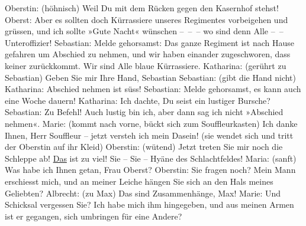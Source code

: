 \begin{ledgroupsized}[t]{13cm}
           \pstart
           Oberstin: (höhnisch) Weil Du mit dem Rücken gegen den Kasernhof stehst!\pend
           \pstart
           Oberst: Aber es sollten doch Kürrassiere unseres Regimentes vorbeigehen und grüssen,
               und ich sollte »Gute Nacht« wünschen – – – wo sind denn Alle – – Unteroffizier!\pend
           \pstart
           Sebastian: Melde gehorsamst: Das ganze Regiment ist nach Hause gefahren um Abschied
               zu nehmen, und wir haben einander {\pb}zugeschworen, dass keiner zurückkommt. Wir sind Alle blaue Kürrassiere.\pend
           \pstart
           Katharina: (gerührt zu Sebastian) Geben Sie mir Ihre Hand, Sebastian\pend
           \pstart
           Sebastian: (gibt die Hand nicht)\pend
           \pstart
           Katharina: Abschied nehmen ist süss!\pend
           \pstart
           Sebastian: Melde gehorsamst, es kann auch eine Woche dauern!\pend
           \pstart
           Katharina: Ich dachte, Du seist ein lustiger Bursche?\pend
           \pstart
           Sebastian: Zu Befehl! Auch lustig bin ich, aber dann sag ich nicht »Abschied
               nehmen«.\pend
           \pstart
           Marie: (kommt nach vorne, bückt sich zum Souffleurkasten) Ich danke Ihnen, Herr
               Souffleur – jetzt versteh ich mein Dasein! (sie wendet sich und tritt der Oberstin
               auf ihr Kleid)\pend
           \pstart
           Oberstin: (wütend) Jetzt treten Sie mir noch die Schleppe ab! \uline{Das} ist zu viel! Sie – Sie – Hyäne des Schlachtfeldes!\pend
           \pstart
           Maria: (sanft) Was habe ich Ihnen getan, Frau Oberst?\pend
           \pstart
           Oberstin: Sie fragen noch? Mein Mann erschiesst mich, und an meiner Leiche hängen Sie
               sich an den Hals meines Geliebten?\pend
           \pstart
           Albrecht: (zu Max) Das sind  Zusammenhänge, Max!\pend
           \pstart
           Marie: Und  Schicksal vergessen Sie? Ich habe mich ihm
               hingegeben, und aus meinen Armen ist er gegangen, sich umbringen für eine Andere?
                  \label{K_L01900-2v}\label{K_L01900-2h}\pend

\end{ledgroupsized}
